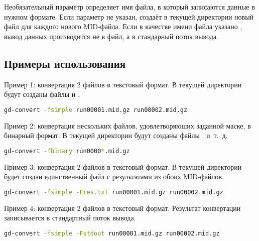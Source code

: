 Необязательный параметр  определяет имя файла, в который записаются данные в нужном формате. Если параметр не указан, \GDCONVERT{} создаёт в текущей директории новый файл для каждого нового MID-файла. Если в качестве имени файла указано , вывод данных производится не в файл, а в стандарный поток вывода.

\subsection{Примеры использования}

Пример 1: конвертация 2 файлов в текстовый формат. В текущей директории будут созданы файлы  и .

\begin{lstlisting}[language=bash]
gd-convert -fsimple run00001.mid.gz run00002.mid.gz
\end{lstlisting}

\bigskip

Пример 2: конвертация нескольких файлов, удовлетворяюших заданной маске, в бинарный формат. В текущей директории будут созданы файлы ,  и~т.~д.

\begin{lstlisting}[language=bash]
gd-convert -fbinary run0000*.mid.gz
\end{lstlisting}

\bigskip

Пример 3: конвертация 2 файлов в текстовый формат. В текущей директории будет создан единственный файл  с результатами из обоих MID-файлов.

\begin{lstlisting}[language=bash]
gd-convert -fsimple -Fres.txt run00001.mid.gz run00002.mid.gz
\end{lstlisting}

\bigskip

Пример 4: конвертация 2 файлов в текстовый формат. Результат конвертации записывается в стандартный поток вывода.

\begin{lstlisting}[language=bash]
gd-convert -fsimple -Fstdout run00001.mid.gz run00002.mid.gz
\end{lstlisting}
